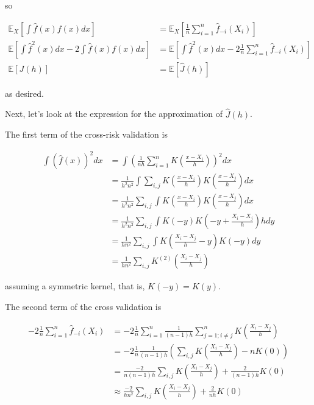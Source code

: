 so

\[
\begin{align}
\mathbb{E}_X\left[ \int \hat{f}(x) f(x) dx \right] &= \mathbb{E}_X\left[ \frac{1}{n} \sum_{i=1}^n \hat{f}_{-i}(X_i) \right] \\
\mathbb{E}\left[ \int \hat{f}^2(x) dx - 2 \int \hat{f}(x) f(x) dx \right] &= \mathbb{E}\left[ \int \hat{f}^2(x) dx - 2 \frac{1}{n} \sum_{i=1}^n \hat{f}_{-i}(X_i) \right] \\
\mathbb{E}[J(h)] &= \mathbb{E}[\hat{J}(h)]
\end{align}
\]

as desired.

Next, let's look at the expression for the approximation of
\(\hat{J}(h)\).

The first term of the cross-risk validation is

\[ 
\begin{align}
\int \left(\hat{f}(x)\right)^2 dx &= \int \left( \frac{1}{nh} \sum_{i=1}^n K\left( \frac{x - X_i}{h} \right) \right)^2 dx \\
&= \frac{1}{h^2n^2} \int \sum_{i, j} K \left(\frac{x - X_i}{h}\right) K\left(\frac{x - X_j}{h}\right) dx \\
&= \frac{1}{h^2n^2} \sum_{i, j} \int  K \left(\frac{x - X_i}{h}\right) K\left(\frac{x - X_j}{h}\right) dx \\
&= \frac{1}{h^2n^2} \sum_{i, j} \int  K(-y) K\left(-y + \frac{X_i - X_j}{h} \right) h dy \\
&= \frac{1}{hn^2} \sum_{i, j} \int  K\left(\frac{X_i - X_j}{h} - y \right) K(-y) dy \\
&= \frac{1}{hn^2} \sum_{i, j} K^{(2)} \left(\frac{X_i - X_j}{h} \right)
\end{align}
\]

assuming a symmetric kernel, that is, \(K(-y) = K(y)\).

The second term of the cross validation is

\[
\begin{align}
- 2 \frac{1}{n} \sum_{i=1}^n \hat{f}_{-i}(X_i)
&= -2 \frac{1}{n} \sum_{i=1}^n \frac{1}{(n - 1) h} \sum_{j=1; i \neq j}^n K \left( \frac{X_i - X_j}{h} \right) \\
&= -2 \frac{1}{n} \frac{1}{(n - 1) h} \left( \sum_{i, j} K \left( \frac{X_i - X_j}{h} \right) - n K(0)\right) \\
&= \frac{-2}{n (n - 1) h} \sum_{i, j} K \left( \frac{X_i - X_j}{h} \right)
+ \frac{2}{(n - 1) h} K(0) \\
&\approx \frac{-2}{h n^2} \sum_{i, j} K \left( \frac{X_i - X_j}{h} \right)
+ \frac{2}{nh} K(0)
\end{align}
\]

